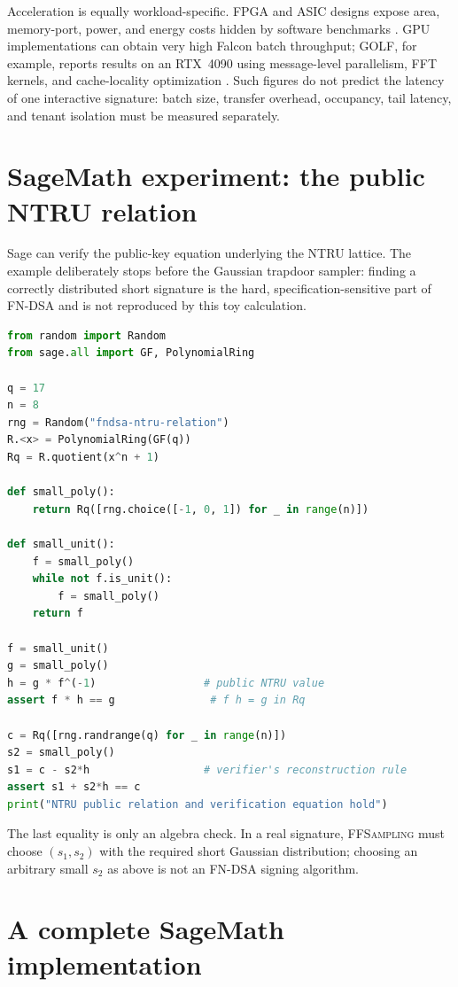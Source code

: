 Acceleration is equally workload-specific. FPGA and ASIC designs expose area,
memory-port, power, and energy costs hidden by software benchmarks
\cite{beckwithhw2022,beckwithhw2024}. GPU implementations can obtain very high
Falcon batch throughput; GOLF, for example, reports results on an RTX~4090 using
message-level parallelism, FFT kernels, and cache-locality optimization
\cite{golf2025}. Such figures do not predict the latency of one interactive
signature: batch size, transfer overhead, occupancy, tail latency, and tenant
isolation must be measured separately.

\section{SageMath experiment: the public NTRU relation}

Sage can verify the public-key equation underlying the NTRU lattice. The
example deliberately stops before the Gaussian trapdoor sampler: finding a
correctly distributed short signature is the hard, specification-sensitive part
of FN-DSA and is not reproduced by this toy calculation.

\begin{lstlisting}[language=Python]
from random import Random
from sage.all import GF, PolynomialRing

q = 17
n = 8
rng = Random("fndsa-ntru-relation")
R.<x> = PolynomialRing(GF(q))
Rq = R.quotient(x^n + 1)

def small_poly():
    return Rq([rng.choice([-1, 0, 1]) for _ in range(n)])

def small_unit():
    f = small_poly()
    while not f.is_unit():
        f = small_poly()
    return f

f = small_unit()
g = small_poly()
h = g * f^(-1)                 # public NTRU value
assert f * h == g               # f h = g in Rq

c = Rq([rng.randrange(q) for _ in range(n)])
s2 = small_poly()
s1 = c - s2*h                  # verifier's reconstruction rule
assert s1 + s2*h == c
print("NTRU public relation and verification equation hold")
\end{lstlisting}

The last equality is only an algebra check. In a real signature, \textsc{FFSampling}
must choose $(s_1,s_2)$ with the required short Gaussian distribution; choosing
an arbitrary small $s_2$ as above is not an FN-DSA signing algorithm.

\section{A complete SageMath implementation}
\label{sec:fips206-impl}

